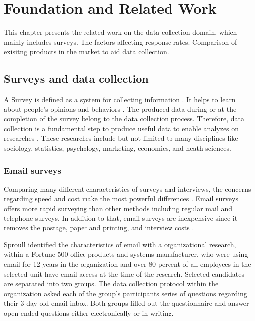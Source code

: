 \chapter{Foundation and Related Work}
\label{chp:FouRelWor}
This chapter presents the related work on the data collection domain, which mainly includes surveys. The factors affecting response rates. Comparison of exisitng products in the market to aid data collection. 

\section{Surveys and data collection}
\label{sec:1:SurDatCol}
A Survey is defined as a system for collecting information \citep[page 3]{Sue2011}. It helps to learn about people's opinions and behaviors \citep{DillmanDonA.SmythJoleneD.Christian2009}.  The produced data during or at the completion of the survey belong to the data collection process. Therefore, data collection is a fundamental step to produce useful data to enable analyzes on researches \citep[page 149]{Groves2009}. These researches include but not limited to many disciplines like sociology, statistics, psychology, marketing, economics, and heath sciences. 

\subsection{Email surveys}
\label{sec:2.1.1:EmaSur}

Comparing many different characteristics of surveys and interviews, the concerns regarding speed and cost make the most powerful differences \citep{Sproull1986, Schaefer1998}. Email surveys offers more rapid surveying than other methods including regular mail and telephone surveys. In addition to that, email surveys are inexpensive since it removes the postage, paper and printing, and interview costs \citep{Schaefer1998}.
\vspace{1cm}

Sproull \citep{Sproull1986} identified the characteristics of email with a organizational research, within a Fortune 500 office products and systems manufacturer, who were using email for 12 years in the organization and over 80 percent of all employees in the selected unit have email access at the time of the research. Selected candidates are separated into two groups. The data collection protocol within the organization asked each of the group's participants series of questions regarding their 3-day old email inbox. Both groups filled out the questionnaire and answer open-ended questions either electronically or in writing.
\vspace{1cm}

